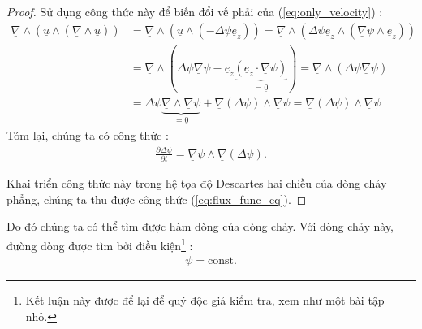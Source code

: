 \documentclass[CO_LUU_CHAT.tex]{subfiles}
\begin{document}
\begin{proof}
Sử dụng công thức này để biến đổi vế phải của (\ref{eq:only_velocity}) :
\[
\begin{aligned}
\underline \nabla   \wedge \left( {\underline u  \wedge \left( {\underline \nabla   \wedge \underline u } \right)} \right) &= \underline \nabla   \wedge \left( {\underline u  \wedge \left( { - \Delta \psi {{\underline e }_z}} \right)} \right) = \underline \nabla   \wedge \left( {\Delta \psi {{\underline e }_z} \wedge \left( {\underline \nabla  \psi  \wedge {{\underline e }_z}} \right)} \right)\\
&= \underline \nabla   \wedge \left( {\Delta \psi \underline \nabla  \psi  - {{\underline e }_z}\underbrace {\left( {{{\underline e }_z} \cdot \underline \nabla  \psi } \right)}_{ = \underline 0 }} \right) = \underline \nabla   \wedge \left( {\Delta \psi \underline \nabla  \psi } \right)\\
& = \Delta \psi \underbrace {\underline \nabla   \wedge \underline \nabla  \psi }_{ = \underline 0 } + \underline \nabla  \left( {\Delta \psi } \right) \wedge \underline \nabla  \psi  = \underline \nabla  \left( {\Delta \psi } \right) \wedge \underline \nabla  \psi
\end{aligned}
\]
Tóm lại, chúng ta có công thức :
\begin{equation}
	\begin{aligned}
		\boxed{
			\frac{{\partial \Delta \psi }}{{\partial t}} = \underline \nabla  \psi  \wedge \underline \nabla  \left( {\Delta \psi } \right)
		}.
	\end{aligned}
\end{equation}

Khai triển công thức này trong hệ tọa độ Descartes hai chiều của dòng chảy phẳng, chúng ta thu được công thức (\ref{eq:flux_func_eq}).
\end{proof}

Do đó chúng ta có thể tìm được hàm dòng của dòng chảy. Với dòng chảy này, đường dòng được tìm bởi điều kiện\footnote{Kết luận này được để lại để quý độc giả kiểm tra, xem như một bài tập nhỏ.} :
\begin{equation}
	\begin{aligned}
		\psi=\text{const}.
	\end{aligned}
\end{equation}
\end{document}

